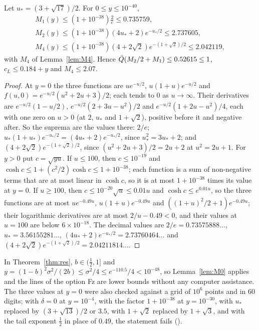 \begin{lemma} \proofst
\label{lem:M0}
Let $u_*=(3+\sqrt{17})/2$. For $0\le y\le10^{-40}$,
\begin{gather}
M_1(y)\le(1+10^{-38})\tfrac2e\le0.735759,\nonumber\\
M_2(y)\le(1+10^{-38})(4u_*+2)e^{-u_*/2}\le2.737605,\nonumber\\
M_4(y)\le(1+10^{-38})(4+2\sqrt2)e^{-(1+\sqrt2)/2}\le2.042119,\nonumber
\end{gather}
with $M_4$ of Lemma~\ref{lem:M4}. Hence $\bar Q(M_2/2+M_1)\le0.52615\le1$, $c_L\le0.184+y$ and $M_4\le2.07$.
\end{lemma}
\begin{proof}
At $y=0$ the three functions are $ue^{-u/2}$, $u(1+u)e^{-u/2}$ and $f(u,0)=e^{-u/2}(u^2+2u+3)/2$; each tends to $0$ as $u\to\infty$.
Their derivatives are $e^{-u/2}(1-u/2)$, $e^{-u/2}(2+3u-u^2)/2$ and $e^{-u/2}(1+2u-u^2)/4$, each with one zero on $u>0$ (at $2$, $u_*$ and $1+\sqrt2$), positive before it and negative after.
So the suprema are the values there: $2/e$; $u_*(1+u_*)e^{-u_*/2}=(4u_*+2)e^{-u_*/2}$, since $u_*^2=3u_*+2$; and $(4+2\sqrt2)e^{-(1+\sqrt2)/2}$, since $(u^2+2u+3)/2=2u+2$ at $u^2=2u+1$.
For $y>0$ put $c=\sqrt{yu}$. If $u\le100$, then $c\le10^{-19}$ and $\cosh c\le1+(c^2/2)\cosh c\le1+10^{-38}$; each function is a sum of non-negative terms that are at most linear in $\cosh c$, so it is at most $1+10^{-38}$ times its value at $y=0$.
If $u\ge100$, then $c\le10^{-20}\sqrt u\le0.01u$ and $\cosh c\le e^{0.01u}$, so the three functions are at most $ue^{-0.49u}$, $u(1+u)e^{-0.49u}$ and $((1+u)^2/2+1)e^{-0.49u}$; their logarithmic derivatives are at most $2/u-0.49<0$, and their values at $u=100$ are below $6\times10^{-18}$.
The decimal values are $2/e=0.73575888\ldots$, $u_*=3.56155281\ldots$, $(4u_*+2)e^{-u_*/2}=2.73760464\ldots$ and $(4+2\sqrt2)e^{-(1+\sqrt2)/2}=2.04211814\ldots$.
\end{proof}
In Theorem~\ref{thm:res}, $b\in(\frac12,1]$ and $y=(1-b)^2\sigma^2/(2b)\le\sigma^2/4\le e^{-110.5}/4<10^{-48}$, so Lemma~\ref{lem:M0} applies and the lines of the option Fz are lower bounds without any computer assistance.
The three values at $y=0$ were also checked against a grid of $10^6$ points and in $60$ digits; with $\delta=0$ at $y=10^{-4}$, with the factor $1+10^{-38}$ at $y=10^{-30}$, with $u_*$ replaced by $(3+\sqrt{13})/2$ or $3.5$, with $1+\sqrt2$ replaced by $1+\sqrt3$, and with the tail exponent $\frac12$ in place of $0.49$, the statement fails \numst{} ().

